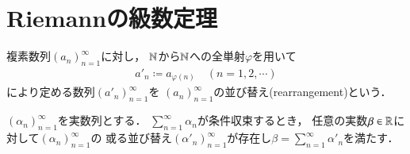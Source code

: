 \chapter{Riemannの級数定理}
	複素数列$(a_n)_{n=1}^{\infty}$に対し，
	$\mathbb{N}$から$\mathbb{N}$への全単射$\varphi$を用いて
	\begin{align}
		a'_n \coloneqq a_{\varphi(n)} \quad (n=1,2,\cdots)
	\end{align}
	により定める数列$\left( a'_n \right)_{n=1}^{\infty}$を
	$(a_n)_{n=1}^{\infty}$の並び替え(rearrangement)という．
	
	\begin{screen}
		\begin{thm}[Riemannの級数定理]
			$(\alpha_n)_{n=1}^{\infty}$を実数列とする．
			$\sum_{n=1}^{\infty} \alpha_n$が条件収束するとき，
			任意の実数$\beta \in \mathbb{R}$に対して$(\alpha_n)_{n=1}^{\infty}$の
			或る並び替え$(\alpha'_n)_{n=1}^{\infty}$が存在し$\beta = \sum_{n=1}^{\infty} \alpha'_n$を満たす．
			\label{thm:Riemann_series}
		\end{thm}
	\end{screen}
	
